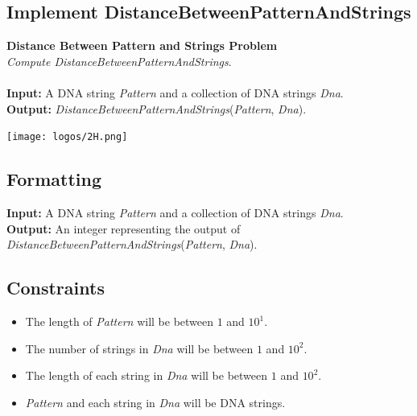 \documentclass{article}
\begin{document}
\subsection{Implement DistanceBetweenPatternAndStrings}
\hline\vspace{5}
\noindent\textbf{Distance Between Pattern and Strings Problem}\\
\emph{Compute DistanceBetweenPatternAndStrings}.\\ \\
\noindent\textbf{Input:} A DNA string \emph{Pattern} and a collection of DNA strings \emph{Dna}.\\
\noindent\textbf{Output:} \emph{DistanceBetweenPatternAndStrings}(\emph{Pattern}, \emph{Dna}).
\begin{center}
    \texttt{[image: logos/2H.png]} 
\end{center}
\hline\vspace{5}

\subsection*{Formatting}
\noindent\textbf{Input:} A DNA string \emph{Pattern} and a collection of DNA strings \emph{Dna}.\\
\noindent\textbf{Output:} An integer representing the output of \emph{DistanceBetweenPatternAndStrings}(\emph{Pattern}, \emph{Dna}).

\subsection*{Constraints}
\begin{itemize}
    \item The length of \emph{Pattern} will be between $1$ and $10^1$.
    \item The number of strings in \emph{Dna} will be between $1$ and $10^2$.
    \item The length of each string in \emph{Dna} will be between $1$ and $10^2$.
    \item \emph{Pattern} and each string in \emph{Dna} will be DNA strings.
\end{itemize}
\pagebreak
\end{document}
